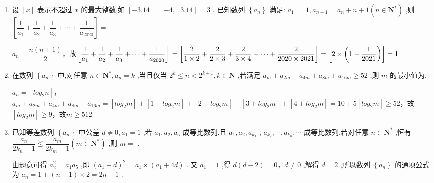 \begin{enumerate}
\begin{jieda}
        设$b_n = S_{2n+1} - S_n = \dfrac{1}{n+1} + \dfrac{1}{n+2} + \cdots + \dfrac{1}{2n+1}$，则$b_{n+1} - b_n = \dfrac{1}{2n+2}+\dfrac{1}{2n+3} - \dfrac{1}{n+1} < 0$，故$S_{2n+1} - S_n \leq S_3 - S_1 = \dfrac{5}{6}$，故$t \geq 25$
    \end{jieda}
    
    \item 设 $\left\lbrack  x\right\rbrack$ 表示不超过 $x$ 的最大整数,如 $\left\lbrack  {-{3.14}}\right\rbrack   =  - 4,\left\lbrack  {3.14}\right\rbrack   = 3$ . 已知数列 $\left\{  {a}_{n}\right\}$ 满足: ${a}_{1} =$  $1,{a}_{n + 1} = {a}_{n} + n + 1\left( {n \in  {\mathbf{N}}^{ * }}\right)$ ,则 $\left\lbrack  {\dfrac{1}{{a}_{1}} + \dfrac{1}{{a}_{2}} + \dfrac{1}{{a}_{3}} + \cdots  + \dfrac{1}{{a}_{2020}}}\right\rbrack =$
    \begin{jieda}
        $a_n = \dfrac{n(n+1)}{2}$，故$\left\lbrack  {\dfrac{1}{{a}_{1}} + \dfrac{1}{{a}_{2}} + \dfrac{1}{{a}_{3}} + \cdots  + \dfrac{1}{{a}_{2020}}}\right\rbrack \\
        = \left\lbrack  {\dfrac{2}{1 \times 2} + \dfrac{2}{2 \times 3} + \dfrac{2}{3 \times 4} + \cdots  + \dfrac{2}{2020 \times 2021}}\right\rbrack = \left[2 \times \left(1 - \dfrac{1}{2021}\right)\right] = 1$
    \end{jieda}
    \item 在数列 $\left\{  {a}_{n}\right\}$ 中,对任意 $n \in  {\mathbf{N}}^{ * },{a}_{n} = k$ ,当且仅当 ${2}^{k} \leq  n < {2}^{k + 1},k \in  \mathbf{N}$ ,若满足 ${a}_{m} + {a}_{2m} + {a}_{4m} + {a}_{8m} + {a}_{16m} \geq  {52}$ ,则 $m$ 的最小值为.
    \begin{jieda}
        $a_n = [log_2n]$，${a}_{m} + {a}_{2m} + {a}_{4m} + {a}_{8m} + {a}_{16m} = [log_2m] + [1+log_2m] + [2+log_2m] + [3+log_2m]+ [4+log_2m] = 10+5[log_2m] \geq 52$，故$[log_2m] \geq 9$，故$m \geq 512$
    \end{jieda}
    \item 已知等差数列 $\left\{  {a}_{n}\right\}$ 中公差 $d \neq  0,{a}_{1} = 1$ ,若 ${a}_{1},{a}_{2},{a}_{5}$ 成等比数列,且 ${a}_{1},{a}_{2},{a}_{{k}_{1}}$ , ${a}_{{k}_{2}},\cdots ,{a}_{{k}_{n}},\cdots$ 成等比数列,若对任意 $n \in  {\mathbf{N}}^{ * }$ ,恒有 $\dfrac{{a}_{n}}{2{k}_{n} - 1} \leq  \dfrac{{a}_{m}}{2{k}_{m} - 1}\left( {m \in  {\mathbf{N}}^{ * }}\right)$ ,则 $m =$ .
    \begin{jieda}
        由题意可得 ${a}_{2}^{2} = {a}_{1}{a}_{5}$ ,即 ${\left( {a}_{1} + d\right) }^{2} = {a}_{1} \times  \left( {{a}_{1} + {4d}}\right)$ . 又 ${a}_{1} = 1$ ,得 $d\left( {d - 2}\right)  = 0$，$d \neq  0$ ,解得 $d = 2$ ,所以数列 $\left\{  {a}_{n}\right\}$ 的通项公式为 ${a}_{n} = 1 + \left( {n - 1}\right)  \times  2 = {2n} - 1$ .
            

\end{jieda}
\end{enumerate}
